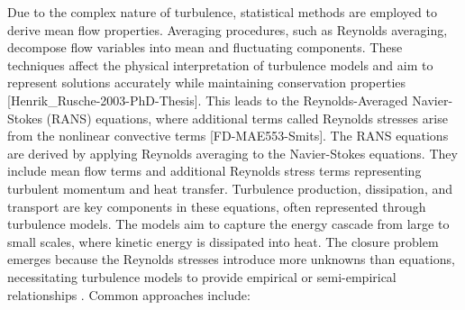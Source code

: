 Due to the complex nature of turbulence, statistical methods are employed to derive mean flow properties. Averaging procedures, 
such as Reynolds averaging, decompose flow variables into mean and fluctuating components. These techniques affect the physical interpretation of turbulence
models and aim to represent solutions accurately while maintaining conservation properties [Henrik\_Rusche-2003-PhD-Thesis]. 
This leads to the Reynolds-Averaged 
Navier-Stokes (RANS) equations, where additional terms called Reynolds stresses arise from the nonlinear convective terms [FD-MAE553-Smits].
The RANS equations are derived by applying Reynolds averaging to the Navier-Stokes equations. They include mean flow terms and 
additional Reynolds stress terms representing turbulent momentum  and heat transfer.
Turbulence production, dissipation, and transport are key components in these equations, often represented through turbulence models. 
The models aim to capture the energy cascade from large to small scales, where kinetic energy is dissipated into heat.
The closure problem emerges because the Reynolds stresses introduce more unknowns than equations, 
necessitating turbulence models to provide 
empirical or semi-empirical relationships . 
Common approaches include:
